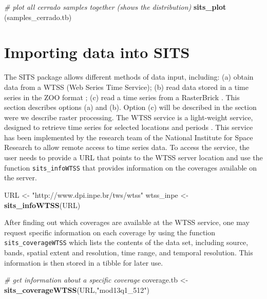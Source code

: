 \documentclass[11pt,]{article}
\newenvironment{Shaded}{\begin{snugshade}}{\end{snugshade}}
\newcommand{\KeywordTok}[1]{\textcolor[rgb]{0.13,0.29,0.53}{\textbf{#1}}}
\newcommand{\StringTok}[1]{\textcolor[rgb]{0.31,0.60,0.02}{#1}}
\newcommand{\CommentTok}[1]{\textcolor[rgb]{0.56,0.35,0.01}{\textit{#1}}}
\newcommand{\NormalTok}[1]{#1}
\begin{document}
\begin{Shaded}
\begin{Highlighting}[]
\CommentTok{# plot all cerrado samples together (shows the distribution)}
\KeywordTok{sits_plot}\NormalTok{ (samples_cerrado.tb)}
\end{Highlighting}
\end{Shaded}

\section{Importing data into SITS}\label{importing-data-into-sits}

The SITS package allows different methods of data input, including: (a)
obtain data from a WTSS (Web Series Time Service); (b) read data stored
in a time series in the ZOO format \citep{Zeileis2005}; (c) read a time
series from a RasterBrick \citep{Hijmans2015}. This section describes
options (a) and (b). Option (c) will be described in the section were we
describe raster processing. The WTSS service is a light-weight service,
designed to retrieve time series for selected locations and periods
\citep{Vinhas2016}. This service has been implemented by the research
team of the National Institute for Space Research to allow remote access
to time series data. To access the service, the user needs to provide a
URL that points to the WTSS server location and use the function
\texttt{sits\_infoWTSS} that provides information on the coverages
available on the server.

\begin{Shaded}
\begin{Highlighting}[]
\NormalTok{URL <-}\StringTok{ "http://www.dpi.inpe.br/tws/wtss"}
\NormalTok{wtss_inpe <-}\StringTok{ }\KeywordTok{sits_infoWTSS}\NormalTok{(URL)}
\end{Highlighting}
\end{Shaded}

After finding out which coverages are available at the WTSS service, one
may request specific information on each coverage by using the function
\texttt{sits\_coverageWTSS} which lists the contents of the data set,
including source, bands, spatial extent and resolution, time range, and
temporal resolution. This information is then stored in a tibble for
later use.

\begin{Shaded}
\begin{Highlighting}[]
\CommentTok{# get information about a specific coverage}
\NormalTok{coverage.tb <-}\StringTok{ }\KeywordTok{sits_coverageWTSS}\NormalTok{(URL,}\StringTok{"mod13q1_512"}\NormalTok{)}
\end{Highlighting}
\end{Shaded}
\end{document}
